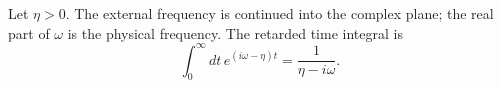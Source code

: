 \documentclass{article}
\begin{document}
Let $\eta>0$. The external frequency is continued into the complex plane; the real part of $\omega$ is the
physical frequency. The retarded time integral is
\begin{equation}
\int_0^{\infty} dt\, e^{(i\omega-\eta)t}=\frac{1}{\eta-i\omega} .
\label{eq:ret}
\end{equation}
\end{document}
